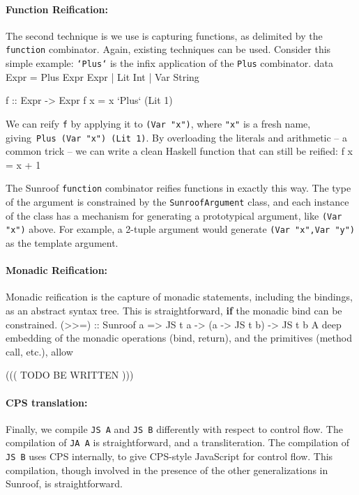 \documentclass{llncs}
\newcommand{\Src}[1]{{\tt{#1}}}
\newenvironment{Code}{\verbatim}{\endverbatim}
\begin{document}
\paragraph{Function Reification:}
The second technique is we use is capturing functions, as delimited
by the \Src{function} combinator. Again, existing techniques can be used.
Consider this simple example: \Src{`Plus`} is the infix application of
the \Src{Plus} combinator.
\begin{Code}
data Expr = Plus Expr Expr | Lit Int | Var String

f :: Expr -> Expr
f x = x `Plus` (Lit 1)
\end{Code}

We can reify \Src{f} by applying it to \Src{(Var "x")}, where \Src{"x"} is a fresh name,
giving~\Src{Plus (Var "x") (Lit 1)}. By overloading the literals and arithmetic -- 
a common trick -- we can write a clean Haskell function that can still be reified:
\begin{Code}
f  x = x + 1
\end{Code}

The Sunroof \Src{function} combinator reifies functions in exactly this way.
The type of the argument is constrained by the \Src{SunroofArgument} class,
and each instance of the class has a mechanism for generating a prototypical
argument, like \Src{(Var "x")} above. For example, a 2-tuple argument
would generate \Src{(Var "x",Var "y")} as the template argument.

\paragraph{Monadic Reification:}

Monadic reification is the capture of monadic statements, including the bindings,
as an abstract syntax tree. This is straightforward, {\bf if\/} the monadic bind
can be constrained.
\begin{Code}
(>>=) :: Sunroof a => JS t a -> (a -> JS t b) -> JS t b
\end{Code}
A deep embedding of the monadic operations (bind, return), and the primitives
(method call, etc.), allow 

((( TODO BE WRITTEN )))

\paragraph{CPS translation:}

Finally, we compile \Src{JS A} and \Src{JS B} differently with respect to control flow.
The compilation of \Src{JA A} is straightforward, and a transliteration.
The compilation of \Src{JS B} uses CPS internally, to give CPS-style JavaScript for
control flow. This compilation, though involved in the presence of the other
generalizations in Sunroof, is straightforward.
\end{document}
